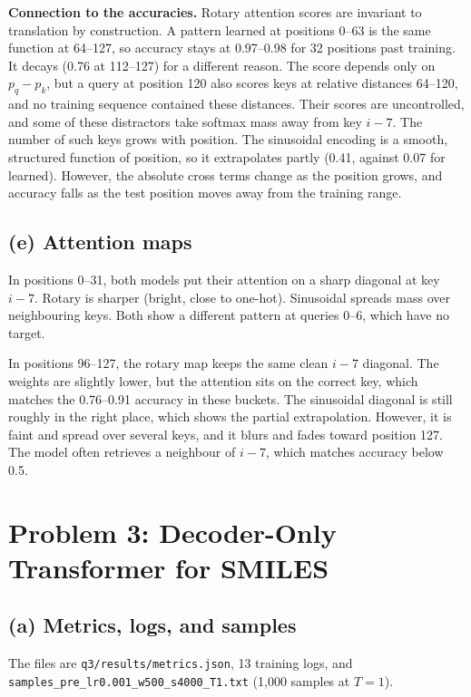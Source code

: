 \documentclass[11pt]{article}
\begin{document}
\textbf{Connection to the accuracies.} Rotary attention scores are invariant to translation by
construction. A pattern learned at positions 0--63 is the same function at 64--127, so
accuracy stays at 0.97--0.98 for 32 positions past training. It decays
(0.76 at 112--127) for a different reason. The score depends only on
$p_q-p_k$, but a query at position 120 also scores keys at relative
distances 64--120, and no training sequence contained these distances. Their scores are
uncontrolled, and some of these distractors take softmax mass away from key $i-7$.
The number of such keys grows with position. The sinusoidal encoding is a smooth, structured function of
position, so it extrapolates partly (0.41, against 0.07 for learned). However, the absolute
cross terms change as the position grows, and accuracy falls as the test position moves away
from the training range.

\subsection*{(e) Attention maps}

In positions 0--31, both models put their attention on a sharp diagonal at key $i-7$.
Rotary is sharper (bright, close to one-hot). Sinusoidal spreads mass over
neighbouring keys. Both show a different pattern at queries 0--6, which have no target.

In positions 96--127, the rotary map keeps the same clean $i-7$ diagonal.
The weights are slightly lower, but the attention sits on the correct key, which matches
the 0.76--0.91 accuracy in these buckets. The sinusoidal diagonal is still roughly in the
right place, which shows the partial extrapolation. However, it is faint and spread over several keys,
and it blurs and fades toward position 127. The model often retrieves a neighbour of $i-7$,
which matches accuracy below 0.5.

\section{Problem 3: Decoder-Only Transformer for SMILES}

\subsection*{(a) Metrics, logs, and samples}

The files are \texttt{q3/results/metrics.json}, 13 training logs, and
\texttt{samples\_pre\_lr0.001\_w500\_s4000\_T1.txt} (1{,}000 samples at $T=1$).
\end{document}
